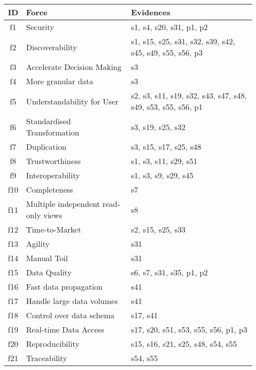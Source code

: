 \begin{tabular}{|c|p{}|p{}|}
\hline
{\bf ID} & {\bf Force} & {\bf Evidences}\\
\hline
f1 & Security & \cellcolor{emerald_shape_3} {s1, s4, s20, s31, p1, p2}\\
f2 & Discoverability & \cellcolor{emerald_shape_4} {s1, s15, s25, s31, s32, s39, s42, s45, s49, s55, s56, p3}\\
f3 & Accelerate Decision Making & \cellcolor{emerald_shape_1} {s3}\\
f4 & More granular data & \cellcolor{emerald_shape_1} {s3}\\
f5 & Understandability for User & \cellcolor{emerald_shape_4} {s2, s3, s11, s19, s32, s43, s47, s48, s49, s53, s55, s56, p1}\\
f6 & Standardised Transformation & \cellcolor{emerald_shape_2} {s3, s19, s25, s32}\\
f7 & Duplication & \cellcolor{emerald_shape_3} {s3, s15, s17, s25, s48}\\
f8 & Trustworthiness & \cellcolor{emerald_shape_3} {s1, s3, s11, s29, s51}\\
f9 & Interoperability & \cellcolor{emerald_shape_3} {s1, s3, s9, s29, s45}\\
f10 & Completeness & \cellcolor{emerald_shape_1} {s7}\\
f11 & Multiple independent read-only views & \cellcolor{emerald_shape_1} {s8}\\
f12 & Time-to-Market & \cellcolor{emerald_shape_2} {s2, s15, s25, s33}\\
f13 & Agility & \cellcolor{emerald_shape_1} {s31}\\
f14 & Manual Toil & \cellcolor{emerald_shape_1} {s31}\\
f15 & Data Quality & \cellcolor{emerald_shape_3} {s6, s7, s31, s35, p1, p2}\\
f16 & Fast data propagation & \cellcolor{emerald_shape_1} {s41}\\
f17 & Handle large data volumes & \cellcolor{emerald_shape_1} {s41}\\
f18 & Control over data schema & \cellcolor{emerald_shape_1} {s17, s41}\\
f19 & Real-time Data Access & \cellcolor{emerald_shape_3} {s17, s20, s51, s53, s55, s56, p1, p3}\\
f20 & Reproducibility & \cellcolor{emerald_shape_3} {s15, s16, s21, s25, s48, s54, s55}\\
f21 & Traceability & \cellcolor{emerald_shape_1} {s54, s55}\\

\end{tabular}
